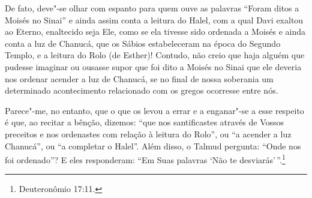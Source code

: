 De fato, deve"-se olhar com espanto para quem ouve as palavras ``Foram
ditos a Moisés no Sinai'' e ainda assim conta a leitura do Halel\starr,
com a qual Davi exaltou ao Eterno, enaltecido seja Ele, como se ela
tivesse sido ordenada a Moisés e ainda conta a luz de Chanucá\starr, que
os Sábios estabeleceram na época do Segundo Templo, e a leitura do Rolo
(de Esther)! Contudo, não creio que haja alguém que pudesse imaginar ou
ousasse supor que foi dito a Moisés no Sinai que ele deveria nos ordenar
acender a luz de Chanucá\starr, se no final de nossa soberania um
determinado acontecimento relacionado com os gregos ocorresse entre nós.

Parece"-me, no entanto, que o que os levou a errar e a enganar"-se a esse
respeito é que, ao recitar a bênção, dizemos: ``que nos santificastes
através de Vossos preceitos e nos ordenastes com relação à leitura do
Rolo'', ou ``a acender a luz Chanucá\starr'', ou ``a completar o Halel\starr''.
Além disso, o Talmud\starr{} pergunta: ``Onde nos foi ordenado''? E eles
responderam: ``Em Suas palavras `Não te desviarás'\,''.\footnote{Deuteronômio
17:11.}

